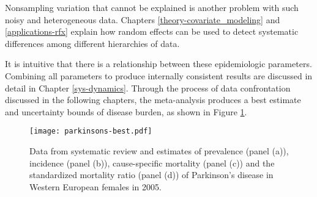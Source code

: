 Nonsampling variation that cannot be explained is another problem with such noisy and heterogeneous data.  Chapters \ref{theory-covariate_modeling} and \ref{applications-rfx} explain how random effects can be used to detect systematic differences among different hierarchies of data.

It is intuitive that there is a relationship between these epidemiologic parameters.  Combining all parameters to produce internally consistent results are discussed in detail in Chapter \ref{sys-dynamics}.  Through the process of data confrontation discussed in the following chapters, the meta-analysis produces a best estimate and uncertainty bounds of disease burden, as shown in Figure \ref{fig:intro-parkinsons fit}.

    \begin{figure}[h]
        \begin{center}
            \texttt{[image: parkinsons-best.pdf]}
            \caption{Data from systematic review and estimates of prevalence (panel (a)), incidence (panel (b)), cause-specific mortality (panel (c)) and the standardized mortality ratio (panel (d)) of Parkinson's disease in Western European females in 2005.}
            \label{fig:intro-parkinsons fit}
        \end{center}
    \end{figure} 